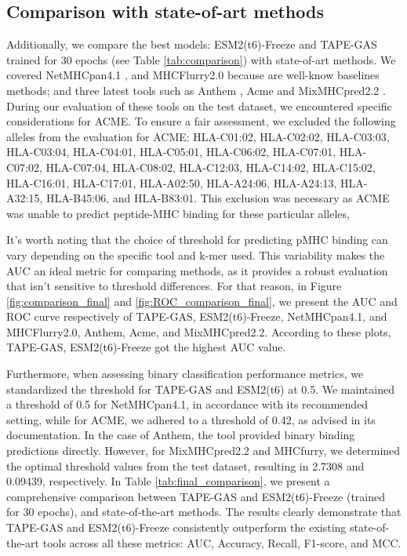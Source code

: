 \subsection{Comparison with state-of-art methods}
Additionally, we compare the best models: ESM2(t6)-Freeze and TAPE-GAS trained for 30 epochs (see Table \ref{tab:comparison}) with state-of-art methods. We covered NetMHCpan4.1 \cite{reynisson2020netmhcpan}, and MHCFlurry2.0 \cite{o2020mhcflurry} because are well-know baselines methods; and three latest tools such as Anthem \cite{mei2021anthem},  Acme \cite{hu2019acme} and MixMHCpred2.2  \cite{gfeller2023improved}. 
During our evaluation of these tools on the test dataset, we encountered specific considerations for ACME. To ensure a fair assessment, we excluded the following alleles from the evaluation for ACME: HLA-C01:02, HLA-C02:02, HLA-C03:03, HLA-C03:04, HLA-C04:01, HLA-C05:01, HLA-C06:02, HLA-C07:01, HLA-C07:02, HLA-C07:04, HLA-C08:02, HLA-C12:03, HLA-C14:02, HLA-C15:02, HLA-C16:01, HLA-C17:01, HLA-A02:50, HLA-A24:06, HLA-A24:13, HLA-A32:15, HLA-B45:06, and HLA-B83:01. This exclusion was necessary as ACME was unable to predict peptide-MHC binding for these particular alleles,

It's worth noting that the choice of threshold for predicting pMHC binding can vary depending on the specific tool and k-mer used. This variability makes the AUC an ideal metric for comparing methods, as it provides a robust evaluation that isn't sensitive to threshold differences. For that reason, in  Figure \ref{fig:comparison_final} and \ref{fig:ROC_comparison_final}, we present the AUC and ROC curve respectively of TAPE-GAS, ESM2(t6)-Freeze, NetMHCpan4.1, and MHCFlurry2.0, Anthem,  Acme, and MixMHCpred2.2. According to these plots, TAPE-GAS, ESM2(t6)-Freeze got the highest AUC value.

Furthermore, when assessing binary classification performance metrics, we standardized the threshold for TAPE-GAS and ESM2(t6) at 0.5. We maintained a threshold of 0.5 for NetMHCpan4.1, in accordance with its recommended setting, while for ACME, we adhered to a threshold of 0.42, as advised in its documentation. In the case of Anthem, the tool provided binary binding predictions directly. However, for MixMHCpred2.2 and MHCfurry, we determined the optimal threshold values from the test dataset, resulting in 2.7308 and 0.09439, respectively. In Table \ref{tab:final_comparison}, we present a comprehensive comparison between TAPE-GAS and ESM2(t6)-Freeze (trained for 30 epochs), and state-of-the-art methods. The results clearly demonstrate that TAPE-GAS and ESM2(t6)-Freeze consistently outperform the existing state-of-the-art tools across all these metrics: AUC, Accuracy, Recall, F1-score, and MCC. 

